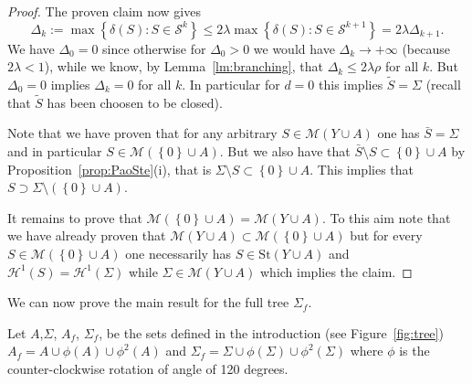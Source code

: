 \documentclass{amsart}
\renewcommand{\H}{\mathcal H}
\newcommand{\ENCLOSE}[1]{\left\{#1\right\}}
\newcommand{\St}{\mathrm{St}}
\newcommand{\M}{\mathcal{M}}
\renewcommand{\H}{\mathcal{H}}
\renewcommand{\S}{\mathcal{S}}
\theoremstyle{definition}
\theoremstyle{remark}
\begin{document}
\begin{proof}
The proven claim now gives 
\[
  \Delta_k 
  := \max\ENCLOSE{\delta(S)\colon S\in \S^k}
   \le 2\lambda \max\ENCLOSE{\delta(S)\colon S\in \S^{k+1}}
   = 2 \lambda \Delta_{k+1}.
\]
We have $\Delta_0 = 0$ since otherwise for 
$\Delta_0>0$ we would have 
$\Delta_k\to +\infty$ (because $2\lambda <1$), while we know,
by Lemma~\ref{lm:branching}, that $\Delta_k \le 2\lambda\rho$
for all $k$.
But $\Delta_0 =0$ implies $\Delta_k=0$ for all $k$.
In particular for $d=0$ this implies $\tilde S=\Sigma$ 
(recall that $\tilde S$ has been choosen to be closed).

Note that we have proven that for any arbitrary $S\in \M(Y\cup A)$ 
one has $\bar S= \Sigma$ and in particular $S\in \M(\ENCLOSE 0 \cup A)$. 
But we also have that $\bar S \setminus S \subset \ENCLOSE{0}\cup A$
by Proposition~\ref{prop:PaoSte}(i),
that is $\Sigma\setminus S \subset \ENCLOSE 0 \cup A$.
This implies that $S\supset \Sigma\setminus(\ENCLOSE 0 \cup A)$.

It remains to prove that $\M(\ENCLOSE 0 \cup A) = \M(Y\cup A)$.
To this aim note that we have already proven 
that $\M(Y\cup A) \subset \M(\ENCLOSE 0 \cup A)$
but for every $S\in \M(\ENCLOSE 0 \cup A)$ one necessarily has 
$S\in \St(Y\cup A)$ and $\H^1(S)=\H^1(\Sigma)$ while
$\Sigma \in \M(Y\cup A)$ which implies the claim.

\end{proof}

We can now prove the main result for the full tree $\Sigma_f$.

Let $A$,$\Sigma$, $A_f$, $\Sigma_f$, be the sets defined in the introduction
(see Figure~\ref{fig:tree})
$A_f = A \cup \phi(A)\cup \phi^2(A)$ and 
$\Sigma_f = \Sigma \cup \phi(\Sigma)\cup \phi^2(\Sigma)$
where $\phi$ is the counter-clockwise rotation of angle of 120 degrees.
\end{document}
